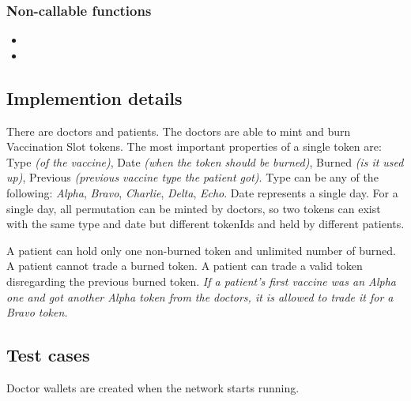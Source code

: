 \subsubsection{Non-callable functions}
\begin{itemize}
  \item {}
  \item {}
\end{itemize}


\subsection{Implemention details}
There are doctors and patients. The doctors are able to mint and burn Vaccination Slot tokens. The most important properties of a single token are: Type \emph{(of the vaccine)}, Date \emph{(when the token should be burned)}, Burned \emph{(is it used up)}, Previous \emph{(previous vaccine type the patient got)}.
Type can be any of the following: \emph{Alpha}, \emph{Bravo}, \emph{Charlie}, \emph{Delta}, \emph{Echo}. Date represents a single day. For a single day, all permutation can be minted by doctors, so two tokens can exist with the same type and date but different tokenIds and held by different patients.

A patient can hold only one non-burned token and unlimited number of burned. A patient cannot trade a burned token.
A patient can trade a valid token disregarding the previous burned token. \emph{If a patient's first vaccine was an Alpha one and got another Alpha token from the doctors, it is allowed to trade it for a Bravo token.}


\newpage
\subsection{Test cases}
Doctor wallets are created when the network starts running.



